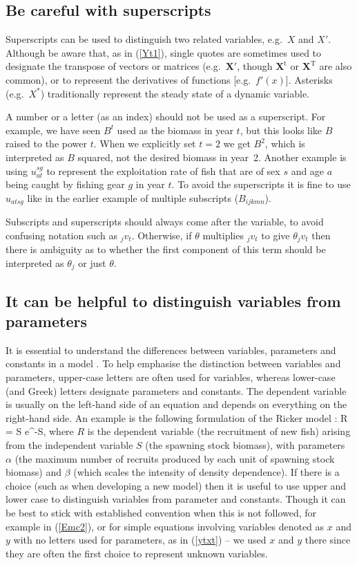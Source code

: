 \subsection*{Be careful with superscripts}

Superscripts can be used to distinguish two related variables, e.g.~$X$ and $X'$.
Although be aware that, as in (\ref{Yt1}), single quotes are sometimes used to designate the
transpose of vectors or matrices (e.g.~$\mathbf{X}'$, though $\mathbf{X}^{\mbox{t}}$ or
$\mathbf{X}^{\mbox{T}}$ are also common),
or to represent the derivatives of functions [e.g.~$f'(x)$].
Asterisks (e.g.~$X^*$) traditionally represent the steady state of a dynamic
variable.

A number or a letter (as an index) should not be used
as a superscript. For example, we have seen $B^t$ used as
the biomass in year $t$, but this looks like $B$ raised to the power $t$.
When we explicitly set $t=2$ we get $B^2$, which is interpreted as $B$
squared, not the desired biomass in year~2.
Another example is using $u_{at}^{sg}$ to represent the exploitation rate
of fish that are of sex $s$ and age $a$ being caught by fishing gear $g$ in
year $t$. To avoid the superscripts it is fine to use $u_{atsg}$ like in the
earlier example of multiple subscripts ($B_{ijkmn}$).

Subscripts and superscripts should always come after the variable, to avoid
confusing notation such as $_jv_t$. Otherwise, if $\theta$ multiplies $_jv_t$
to give $\theta_jv_t$ then there is ambiguity as to whether
the first component of this term should be interpreted as $\theta_j$ or just
$\theta$.

\subsection*{It can be helpful to distinguish variables from parameters}

It is essential to understand the differences between variables, parameters and
constants in a model \citep{ps93}. To help emphasise the distinction between
variables and parameters,
upper-case letters are often used for variables, whereas lower-case (and Greek)
letters designate parameters and constants. The dependent variable is usually on
the
left-hand side of an equation and depends on everything on the right-hand side.
An example is the following formulation of the Ricker model \citep{bjorks12}:
\eb
R = \alpha S \mbox{e}^{-\beta S},
\label{ricker}
\ee
where $R$ is the dependent variable (the recruitment of new fish) arising from
the independent variable $S$ (the spawning stock biomass), with parameters
 $\alpha$ (the maximum number of recruits produced by each unit
of spawning stock biomass) and $\beta$ (which scales the intensity of density
dependence). If there is a choice (such as when
developing a new model) then it is useful to use upper and lower case to
distinguish variables from parameter and constants.
Though it can be best
to stick with established convention when this is not followed, for example in
(\ref{Emc2}), or for simple equations involving variables denoted as $x$ and $y$
with no letters used for parameters, as in (\ref{ytxt}) -- we used $x$ and $y$
there since they are often the first choice to represent unknown variables.

